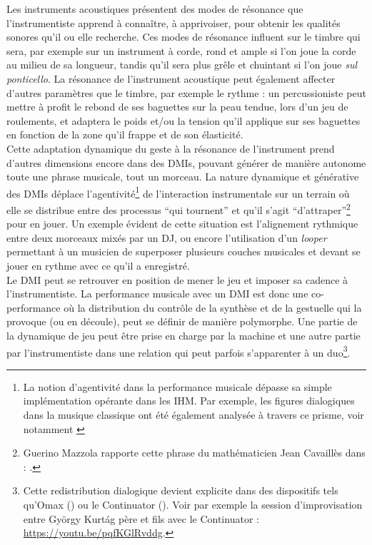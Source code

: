\noindent Les instruments acoustiques présentent des modes de résonance que l'instrumentiste apprend à connaître, à apprivoiser, pour obtenir les qualités sonores qu'il ou elle recherche. Ces modes de résonance influent sur le timbre qui sera, par exemple sur un instrument à corde, rond et ample si l'on joue la corde au milieu de sa longueur, tandis qu'il sera plus grêle et chuintant si l'on joue \textit{sul ponticello}. La résonance de l'instrument acoustique peut également affecter d'autres paramètres que le timbre, par exemple le rythme : un percussioniste peut mettre à profit le rebond de ses baguettes sur la peau tendue, lors d'un jeu de roulements, et adaptera le poids et/ou la tension qu'il applique sur ses baguettes en fonction de la zone qu'il frappe et de son élasticité.\\
\indent Cette adaptation dynamique du geste à la résonance de l'instrument prend d'autres dimensions encore dans des \glspl{DMI}, pouvant générer de manière autonome toute une phrase musicale, tout un morceau. La nature dynamique et générative des \glspl{DMI} déplace l'agentivité\footnote{La notion d'agentivité dans la performance musicale dépasse sa simple implémentation opérante dans les \gls{IHM}. Par exemple, les figures dialogiques dans la musique classique ont été également analysée à travers ce prisme, voir notamment \cite{graybill_whose_2016}} de l'interaction instrumentale sur un terrain où elle se distribue entre des processus ``qui tournent'' et qu'il s'agit ``d'attraper''\footnote{Guerino Mazzola rapporte cette phrase du mathématicien Jean Cavaillès dans \cite{mazzola_topos_2018}: .} pour en jouer. Un exemple évident de cette situation est l'alignement rythmique entre deux morceaux mixés par un \gls{DJ}, ou encore l'utilisation d'un \textit{looper} permettant à un musicien de superposer plusieurs couches musicales et devant se jouer en rythme avec ce qu'il a enregistré.\\
\indent Le \gls{DMI} peut se retrouver en position de mener le jeu et imposer sa cadence à l'instrumentiste. La performance musicale avec un \gls{DMI} est donc une co-performance où la distribution du contrôle de la synthèse et de la gestuelle qui la provoque (ou en découle), peut se définir de manière polymorphe. Une partie de la dynamique de jeu peut être prise en charge par la machine et une autre partie par l'instrumentiste dans une relation qui peut parfois s'apparenter à un duo\footnote{Cette redistribution dialogique devient explicite dans des dispositifs tels qu'Omax (\cite{assayag_omax_2006}) ou le Continuator (\cite{pachet_continuator:_2003}). Voir par exemple la session d'improvisation entre György Kurtág père et fils avec le Continuator : \url{https://youtu.be/pqfKGlRvddg}.}.\\
